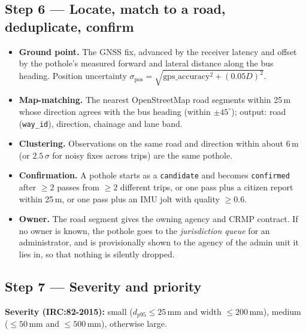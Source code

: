 \documentclass[11pt,a4paper]{article}
\newcommand{\code}[1]{\texttt{\small #1}}
\begin{document}
\subsection{Step 6 --- Locate, match to a road, deduplicate, confirm}
\begin{itemize}
  \item \textbf{Ground point.} The GNSS fix, advanced by the receiver latency and offset by the pothole's measured
        forward and lateral distance along the bus heading. Position uncertainty
        $\sigma_{\text{pos}}=\sqrt{\text{gps\_accuracy}^2+(0.05D)^2}$.
  \item \textbf{Map-matching.} The nearest OpenStreetMap road segments within 25\,m whose direction agrees with
        the bus heading (within $\pm45^\circ$); output: road (\code{way\_id}), direction, chainage and lane band.
  \item \textbf{Clustering.} Observations on the same road and direction within about 6\,m (or
        $2.5\,\sigma$ for noisy fixes across trips) are the same pothole.
  \item \textbf{Confirmation.} A pothole starts as a \code{candidate} and becomes \code{confirmed} after
        $\ge2$ passes from $\ge2$ different trips, or one pass plus a citizen report within 25\,m, or one pass plus
        an IMU jolt with quality $\ge0.6$.
  \item \textbf{Owner.} The road segment gives the owning agency and CRMP contract. If no owner is known, the
        pothole goes to the \emph{jurisdiction queue} for an administrator, and is provisionally shown to the
        agency of the admin unit it lies in, so that nothing is silently dropped.
\end{itemize}

\subsection{Step 7 --- Severity and priority}
\textbf{Severity (IRC:82-2015):} small ($d_{p95}\le25$\,mm and width $\le200$\,mm), medium ($\le50$\,mm and
$\le500$\,mm), otherwise large.
\end{document}
